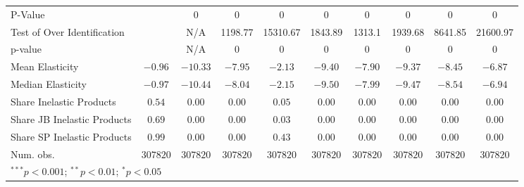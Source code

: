 \begin{tabular}{l c c c c c c c c c}
P-Value                     &               & 0             & 0             & 0             & 0             & 0             & 0             & 0             & 0             \\
Test of Over Identification &               & N/A           & 1198.77       & 15310.67      & 1843.89       & 1313.1        & 1939.68       & 8641.85       & 21600.97      \\
p-value                     &               & N/A           & 0             & 0             & 0             & 0             & 0             & 0             & 0             \\
Mean Elasticity             & $-0.96$       & $-10.33$      & $-7.95$       & $-2.13$       & $-9.40$       & $-7.90$       & $-9.37$       & $-8.45$       & $-6.87$       \\
Median Elasticity           & $-0.97$       & $-10.44$      & $-8.04$       & $-2.15$       & $-9.50$       & $-7.99$       & $-9.47$       & $-8.54$       & $-6.94$       \\
Share Inelastic Products    & $0.54$        & $0.00$        & $0.00$        & $0.05$        & $0.00$        & $0.00$        & $0.00$        & $0.00$        & $0.00$        \\
Share JB Inelastic Products & $0.69$        & $0.00$        & $0.00$        & $0.03$        & $0.00$        & $0.00$        & $0.00$        & $0.00$        & $0.00$        \\
Share SP Inelastic Products & $0.99$        & $0.00$        & $0.00$        & $0.43$        & $0.00$        & $0.00$        & $0.00$        & $0.00$        & $0.00$        \\
Num. obs.                   & $307820$      & $307820$      & $307820$      & $307820$      & $307820$      & $307820$      & $307820$      & $307820$      & $307820$      \\
\bottomrule
\multicolumn{10}{l}{\scriptsize{$^{***}p<0.001$; $^{**}p<0.01$; $^{*}p<0.05$}}
\end{tabular}
